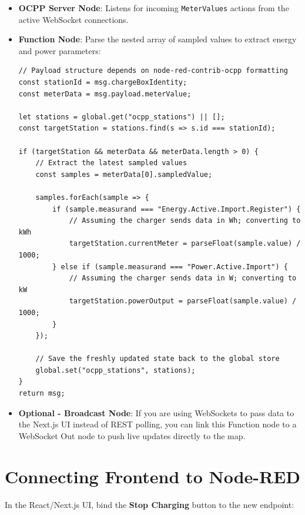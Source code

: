 \documentclass{article}
\begin{document}
\begin{itemize}
    \item \textbf{OCPP Server Node}: Listens for incoming \texttt{MeterValues} actions from the active WebSocket connections.
    \item \textbf{Function Node}: Parse the nested array of sampled values to extract energy and power parameters:
\begin{lstlisting}[caption=Process Incoming MeterValues]
// Payload structure depends on node-red-contrib-ocpp formatting
const stationId = msg.chargeBoxIdentity; 
const meterData = msg.payload.meterValue;

let stations = global.get("ocpp_stations") || [];
const targetStation = stations.find(s => s.id === stationId);

if (targetStation && meterData && meterData.length > 0) {
    // Extract the latest sampled values
    const samples = meterData[0].sampledValue;
    
    samples.forEach(sample => {
        if (sample.measurand === "Energy.Active.Import.Register") {
            // Assuming the charger sends data in Wh; converting to kWh
            targetStation.currentMeter = parseFloat(sample.value) / 1000;
        } else if (sample.measurand === "Power.Active.Import") {
            // Assuming the charger sends data in W; converting to kW
            targetStation.powerOutput = parseFloat(sample.value) / 1000;
        }
    });

    // Save the freshly updated state back to the global store
    global.set("ocpp_stations", stations);
}
return msg;
\end{lstlisting}
    \item \textbf{Optional - Broadcast Node}: If you are using WebSockets to pass data to the Next.js UI instead of REST polling, you can link this Function node to a WebSocket Out node to push live updates directly to the map.
\end{itemize}

\section{Connecting Frontend to Node-RED}

In the React/Next.js UI, bind the \textbf{Stop Charging} button to the new endpoint:
\end{document}
